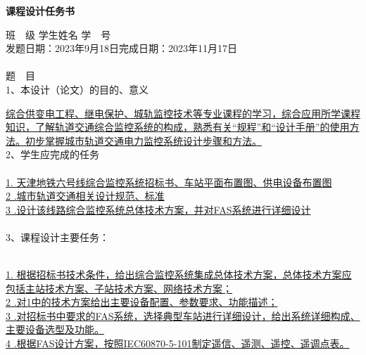 
\vspace*{0.5cm}
\begin{center}{\hei {} \textbf{课程设计任务书}}\end{center}
\vspace{1cm}

\hspace{-0.85cm}班\ \ 级\underline{}
学生姓名\underline{}
学\ \ 号\underline{}
\\发题日期：2023年9月18日\hfill 完成日期：2023年11月17日
\\
\\题\ \ 目\underline{}
\\1、本设计（论文）的目的、意义

\uline{综合供变电工程、继电保护、城轨监控技术等专业课程的学习，综合应用所学课程知识，了解轨道交通综合监控系统的构成，熟悉有关“规程”和“设计手册”的使用方法。初步掌握城市轨道交通电力监控系统设计步骤和方法。}
\\2、学生应完成的任务\\
\noindent
\uline{\\
	1. 天津地铁六号线综合监控系统招标书、车站平面布置图、供电设备布置图\\
	2 .城市轨道交通相关设计规范、标准\\
	3 .设计该线路综合监控系统总体技术方案，并对FAS系统进行详细设计\\
}
\\3、课程设计主要任务：

\uline{\\
	1. 根据招标书技术条件，给出综合监控系统集成总体技术方案，总体技术方案应包括主站技术方案、子站技术方案、网络技术方案；\\
	2 .对1中的技术方案给出主要设备配置、参数要求、功能描述；\\
	3 .对招标书中要求的FAS系统，选择典型车站进行详细设计，给出系统详细构成、主要设备选型及功能。\\
	4 .根据FAS设计方案，按照IEC60870-5-101制定遥信、遥测、遥控、遥调点表。
}

\newpage

